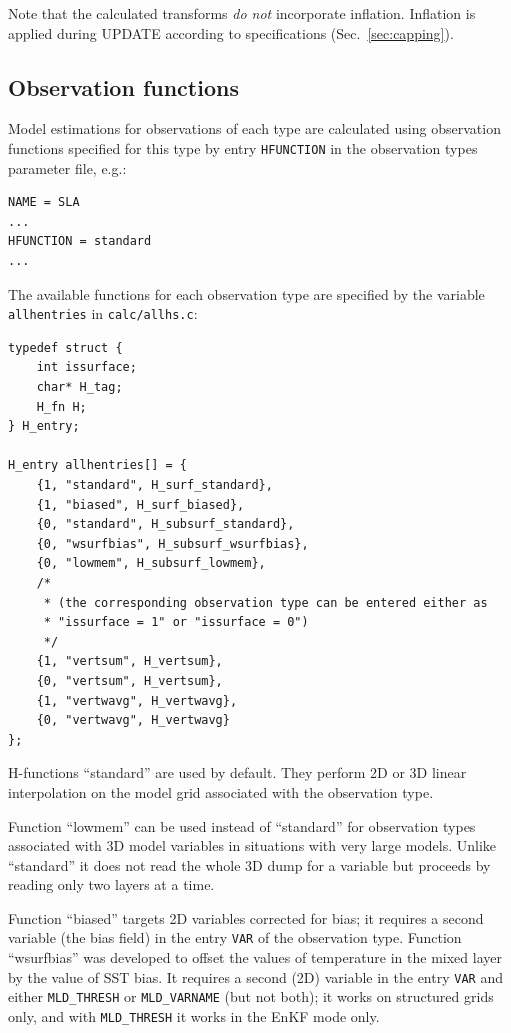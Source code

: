 \documentclass[11pt]{report}
\begin{document}
Note that the calculated transforms \emph{do not} incorporate inflation.
Inflation is applied during UPDATE according to specifications (Sec.~\ref{sec:capping}).

\subsection{Observation functions}
\label{sec:hfunctions}

Model estimations for observations of each type are calculated using observation functions specified for this type by entry \verb|HFUNCTION| in the observation types parameter file, e.g.:
\begin{Verbatim}[frame=single,fontsize=\footnotesize]
NAME = SLA
...
HFUNCTION = standard
...
\end{Verbatim}
The available functions for each observation type are specified by the variable \verb|allhentries| in \verb|calc/allhs.c|:
\begin{Verbatim}
typedef struct {
    int issurface;
    char* H_tag;
    H_fn H;
} H_entry;

H_entry allhentries[] = {
    {1, "standard", H_surf_standard},
    {1, "biased", H_surf_biased},
    {0, "standard", H_subsurf_standard},
    {0, "wsurfbias", H_subsurf_wsurfbias},
    {0, "lowmem", H_subsurf_lowmem},
    /*
     * (the corresponding observation type can be entered either as
     * "issurface = 1" or "issurface = 0")
     */
    {1, "vertsum", H_vertsum},
    {0, "vertsum", H_vertsum},
    {1, "vertwavg", H_vertwavg},
    {0, "vertwavg", H_vertwavg}
};
\end{Verbatim}

H-functions ``standard'' are used by default.
They perform 2D or 3D linear interpolation on the model grid associated with the observation type.

Function ``lowmem'' can be used instead of ``standard'' for observation types associated with 3D model variables in situations with very large models.
Unlike ``standard'' it does not read the whole 3D dump for a variable but proceeds by reading only two layers at a time.

Function ``biased'' targets 2D variables corrected for bias; it requires a second variable (the bias field) in the entry \verb|VAR| of the observation type.
Function ``wsurfbias'' was developed to offset the values of temperature in the mixed layer by the value of SST bias.
It requires a second (2D) variable in the entry \verb|VAR| and either \verb|MLD_THRESH| or \verb|MLD_VARNAME| (but not both); it works on structured grids only, and with \verb|MLD_THRESH| it works in the EnKF mode only.
\end{document}
